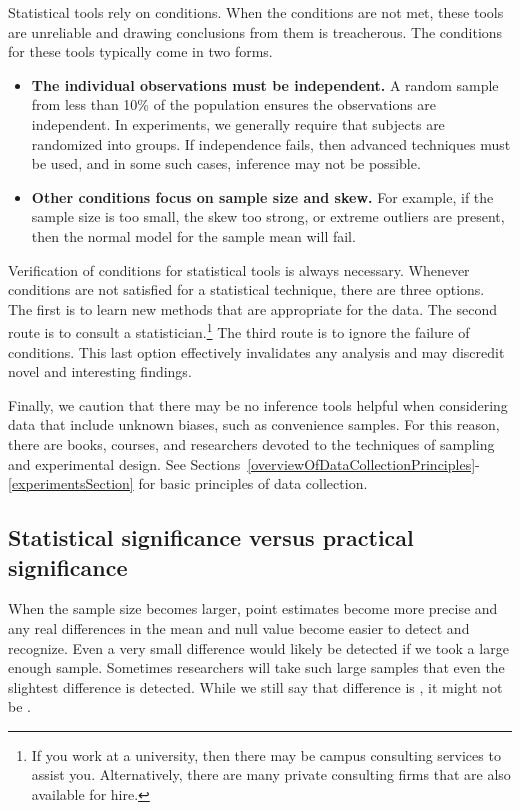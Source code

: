 Statistical tools rely on conditions. When the conditions are not met, these tools are unreliable and drawing conclusions from them is treacherous. The conditions for these tools typically come in two forms.
\begin{itemize}
\setlength{\itemsep}{0mm}
\item \textbf{The individual observations must be independent.} A random sample from less than 10\% of the population ensures the observations are independent. In experiments, we generally require that subjects are randomized into groups. If independence fails, then advanced techniques must be used, and in some such cases, inference may not be possible.
\item \textbf{Other conditions focus on sample size and skew.} For example, if the sample size is too small, the skew too strong, or extreme outliers are present, then the normal model for the sample mean will fail.
\end{itemize}
Verification of conditions for statistical tools is always necessary. Whenever conditions are not satisfied for a statistical technique, there are three options. The first is to learn new methods that are appropriate for the data. The second route is to consult a statistician.\footnote{If you work at a university, then there may be campus consulting services to assist you. Alternatively, there are many private consulting firms that are also available for hire.} The third route is to ignore the failure of conditions. This last option effectively invalidates any analysis and may discredit novel and interesting findings.

Finally, we caution that there may be no inference tools helpful when considering data that include unknown biases, such as convenience samples. For this reason, there are books, courses, and researchers devoted to the techniques of sampling and experimental design. See Sections~\ref{overviewOfDataCollectionPrinciples}-\ref{experimentsSection} for basic principles of data collection.


\subsection{Statistical significance versus practical significance}

When the sample size becomes larger, point estimates become more precise and any real differences in the mean and null value become easier to detect and recognize. Even a very small difference would likely be detected if we took a large enough sample. Sometimes researchers will take such large samples that even the slightest difference is detected. While we still say that difference is , it might not be .

